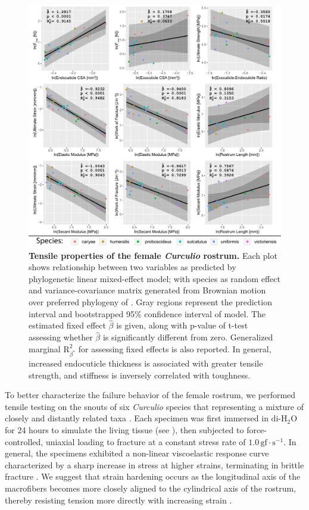 \documentclass[twocolumn, linenumbers, superscriptaddress, nofootinbib]{revtex4-1}
\begin{document}
		\begin{figure}
			\centering
			\includegraphics[width=180mm]{fig4.pdf}
			\caption{\textbf{Tensile properties of the female \textit{Curculio} rostrum.}
				Each plot shows relationship between two variables as predicted by phylogenetic linear mixed-effect model; with species as random effect and variance-covariance matrix generated from Brownian motion over preferred phylogeny of \cite{Bonal2016}.
				Gray regions represent the prediction interval and bootstrapped 95\% confidence interval of model.
				The estimated fixed effect $\hat{\beta}$ is given, along with p-value of t-test assessing whether $\hat{\beta}$ is significantly different from zero.
				Generalized marginal $\text{R}^2_{\beta^*}$ for assessing fixed effects is also reported.
				In general, increased endocuticle thickness is associated with greater tensile strength, and stiffness is inversely correlated with toughness.
			}
			\label{fig::tensile}
		\end{figure}		
	
		To better characterize the failure behavior of the female rostrum, we performed tensile testing on the snouts of six \textit{Curculio} species that representing a mixture of closely and distantly related taxa \cite{Hughes2004phylo, Hughes2004eco, Bonal2016, Bonal2011}.
		Each specimen was first immersed in $\text{di-H}_2\text{O}$ for 24 hours to simulate the living tissue (see \cite{Klocke2011}), then subjected to force-controlled, uniaxial loading to fracture at a constant stress rate of $1.0\,\text{gf}\cdot\text{s}^{-1}$.
		In general, the specimens exhibited a non-linear viscoelastic response curve characterized by a sharp increase in stress at higher strains, terminating in brittle fracture \cite{Mihai2017}.
		We suggest that strain hardening occurs as the longitudinal axis of the macrofibers becomes more closely aligned to the cylindrical axis of the rostrum, thereby resisting tension more directly with increasing strain \cite{Munster2013}.
			
\end{document}
